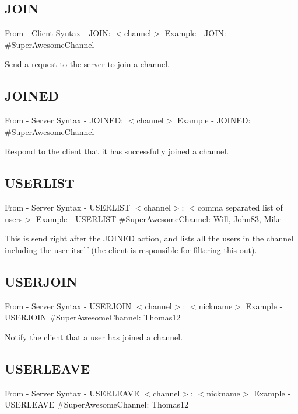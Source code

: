 \documentclass[12pt]{rapport}
\begin{document}
\subsection*{JOIN}
From    - Client\newline
Syntax  - JOIN: $<$channel$>$\newline
Example - JOIN: \#SuperAwesomeChannel\newline

\noindent Send a request to the server to join a channel.

\subsection*{JOINED}
From    - Server\newline
Syntax  - JOINED: $<$channel$>$\newline
Example - JOINED: \#SuperAwesomeChannel\newline

\noindent Respond to the client that it has successfully joined a channel.

\subsection*{USERLIST}
From    - Server\newline
Syntax  - USERLIST $<$channel$>$: $<$comma separated list of users$>$\newline
Example - USERLIST \#SuperAwesomeChannel: Will, John83, Mike\newline

\noindent This is send right after the JOINED action, and lists all
the users in the channel including the user itself (the client is
responsible for filtering this out).

\subsection*{USERJOIN}
From    - Server\newline
Syntax  - USERJOIN $<$channel$>$: $<$nickname$>$\newline
Example - USERJOIN \#SuperAwesomeChannel: Thomas12\newline

\noindent Notify the client that a user has joined a channel.

\subsection*{USERLEAVE}
From    - Server\newline
Syntax  - USERLEAVE $<$channel$>$: $<$nickname$>$\newline
Example - USERLEAVE \#SuperAwesomeChannel: Thomas12\newline
\end{document}
